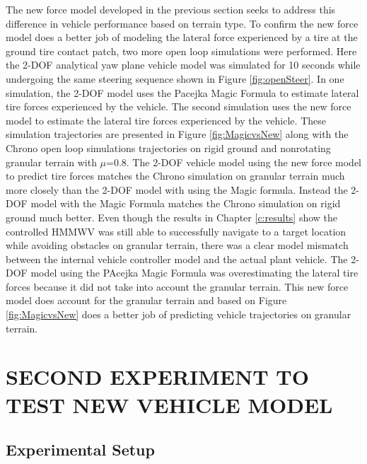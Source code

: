 \documentclass[12pt,onecolumn]{report}
\begin{document}
The new force model developed in the previous section seeks to address this difference in vehicle performance based on terrain type. To confirm the new force model does a better job of modeling the lateral force experienced by a tire at the ground tire contact patch, two more open loop simulations were performed. Here the 2-DOF analytical yaw plane vehicle model was simulated for 10 seconds while undergoing the same steering sequence shown in Figure \ref{fig:openSteer}. In one simulation, the 2-DOF model uses the Pacejka Magic Formula to estimate lateral tire forces experienced by the vehicle. The second simulation uses the new force model to estimate the lateral tire forces experienced by the vehicle. These simulation trajectories are presented in Figure \ref{fig:MagicvsNew} along with the Chrono open loop simulations trajectories on rigid ground and nonrotating granular terrain with $\mu$=0.8. The 2-DOF vehicle model using the new force model to predict tire forces matches the Chrono simulation on granular terrain much more closely than the 2-DOF model with  using the Magic formula. Instead the 2-DOF model with the Magic Formula matches the Chrono simulation on rigid ground much better. Even though the results in Chapter \ref{c:results} show the controlled HMMWV was still able to successfully navigate to a target location while avoiding obstacles on granular terrain, there was a clear model mismatch between the internal vehicle controller model and the actual plant vehicle. The 2-DOF model using the PAcejka Magic Formula was overestimating the lateral tire forces because it did not take into account the granular terrain. This new force model does account for the granular terrain and based on Figure \ref{fig:MagicvsNew} does a better job of predicting vehicle trajectories on granular terrain. 


\chapter{SECOND EXPERIMENT TO TEST NEW VEHICLE MODEL}\label{c:Exp2}

\section{Experimental Setup}\label{s:ExpSetup2}
\end{document}
